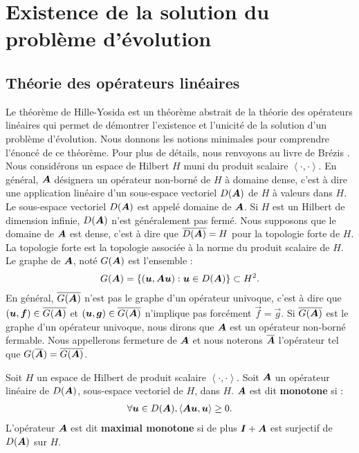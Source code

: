 \chapter{Existence de la solution du problème d'évolution}
\label{annexe:demo_existence}


\section{Théorie des opérateurs linéaires}
\label{sect:theorie_operateurs_lineaires}

Le théorème de Hille-Yosida est un théorème abstrait de la théorie des
opérateurs linéaires qui permet de démontrer l'existence et l'unicité
de la solution d'un problème d'évolution. Nous donnons les notions
minimales pour comprendre l'énoncé de ce théorème.
Pour plus de détails, nous renvoyons au livre de Brézis
\cite{brezis1983analyse}.
\\

Nous considérons un espace de Hilbert $H$
muni du produit scalaire $\left\langle \cdot , \cdot \right\rangle$.
En général, $\bm{A}$ désignera un opérateur non-borné de $H$
à domaine dense, c'est à dire une application linéaire d'un sous-espace vectoriel $D(\bm{A})$ de $H$ à valeurs dans $H$.
Le sous-espace vectoriel $D(\bm{A})$ est appelé domaine de $\bm{A}$.
Si $H$ est un Hilbert de dimension infinie, $D(\bm{A})$
n'est généralement pas fermé. Nous supposons que le domaine de $\bm{A}$
est dense, c'est à dire que $\overline{D(\bm{A})} = H$ pour la topologie forte de $H$.
La topologie forte est la topologie associée à la norme du produit scalaire
de $H$. Le graphe de $\bm{A}$, noté $G(\bm{A})$ est l'ensemble :
\begin{align}
	G(\bm{A}) = \left\{ (\bm{u},\bm{A} \bm{u}) : \bm{u} \in D(\bm{A}) \right\} \subset H^2 .
\end{align}
En général, $\overline{G(\bm{A})}$
n'est pas le graphe d'un opérateur univoque, c'est à dire que
$(\bm{u},\bm{f}) \in \overline{G(\bm{A})}$ et $(\bm{u},\bm{g}) \in \overline{G(\bm{A})}$
n'implique pas forcément $\Vec{f} = \Vec{g}$.
Si $\overline{G(\bm{A})}$ est le graphe d'un opérateur univoque, nous dirons que $\bm{A}$
est un opérateur non-borné fermable. Nous appellerons fermeture de $\bm{A}$
et nous noterons $\overline{\bm{A}}$ l'opérateur tel que $G(\overline{\bm{A}}) = \overline{G(\bm{A})}$.

\begin{definition}
	Soit $H$ un espace de Hilbert de produit scalaire
	$\left\langle \cdot , \cdot\right\rangle$.
	Soit $\bm{A}$ un opérateur linéaire de $D(\bm{A})$, sous-espace vectoriel de $H$,
	dans $H$. $\bm{A}$ est dit \textbf{monotone} si :
	\begin{align}
		\forall \bm{u} \in D(\bm{A}), \left\langle \bm{A} \bm{u} , \bm{u} \right\rangle \ge 0 .
	\end{align}
	L'opérateur $\bm{A}$ est dit \textbf{maximal monotone} si de plus
	$\bm{I} + \bm{A}$ est surjectif de $D(\bm{A})$ sur $H$.
\end{definition}

